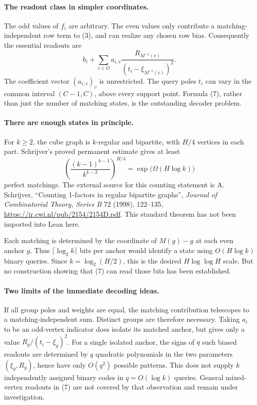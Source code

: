 \documentclass[11pt]{article}
\begin{document}
\paragraph{The readout class in simpler coordinates.}
The odd values of $f_i$ are arbitrary. The even values only contribute
a matching-independent row term to (3), and can realize any chosen
row bias. Consequently the essential readouts are
\[
 b_i+\sum_{v\in O} a_{i,v}
       \frac{R_{M^{-1}(v)}}{(t_i-\xi_{M^{-1}(v)})^2}.
 \tag{7}
\]
The coefficient vector $(a_{i,v})_v$ is unrestricted. The query
poles $t_i$ can vary in the common interval $(C-1,C)$, above every
support point. Formula (7), rather than just the number of matching
states, is the outstanding decoder problem.

\paragraph{There are enough states in principle.}
For $k\geq2$, the cube graph is $k$-regular and bipartite, with
$H/4$ vertices in each part. Schrijver's proved permanent estimate
gives at least
\[
 \left(\frac{(k-1)^{k-1}}{k^{k-2}}\right)^{H/4}
 =\exp\bigl(\Omega(H\log k)\bigr)
 \tag{8}
\]
perfect matchings. The external source for this counting statement
is A. Schrijver, ``Counting 1-factors in regular bipartite graphs'',
\emph{Journal of Combinatorial Theory, Series B} 72 (1998), 122--135,
\url{https://ir.cwi.nl/pub/2154/2154D.pdf}.
This standard theorem has not been imported into Lean here.

Each matching is determined by the coordinate of $M(g)-g$ at each
even anchor $g$. Thus $\lceil\log_2 k\rceil$ bits per anchor would
identify a state using $O(H\log k)$ binary queries. Since
$k=\log_2(H/2)$, this is the desired $H\log\log H$ scale.
But no construction showing that (7) can read those bits has been
established.

\paragraph{Two limits of the immediate decoding ideas.}
If all group poles and weights are equal, the matching contribution
telescopes to a matching-independent sum. Distinct groups are
therefore necessary. Taking $a_i$ to be an odd-vertex indicator does
isolate its matched anchor, but gives only a value
$R_g/(t_i-\xi_g)^2$. For a single isolated anchor, the signs of $q$
such biased readouts are determined by $q$ quadratic polynomials in
the two parameters $(\xi_g,R_g)$, hence have only $O(q^2)$ possible
patterns. This does not supply $k$ independently assigned binary
codes in $q=O(\log k)$ queries. General mixed-vertex readouts in (7)
are not covered by that observation and remain under investigation.
\end{document}
